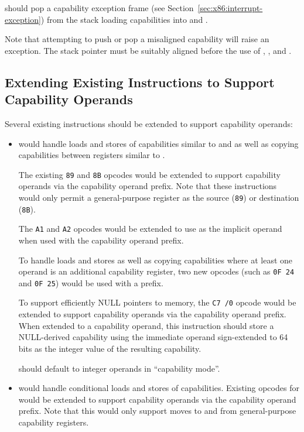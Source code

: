  should pop a capability exception frame (see
Section~\ref{sec:x86:interrupt-exception}) from the stack loading
capabilities into \CIP{} and \CSP{}.

Note that attempting to push or pop a misaligned capability will raise
an exception.  The stack pointer must be suitably aligned before the
use of , , and .

\subsection{Extending Existing Instructions to Support Capability Operands}

Several existing instructions should be extended to support
capability operands:

\begin{itemize}
  \item {} would handle loads and stores of
    capabilities similar to  and  as well as
    copying capabilities between registers similar to .

    The existing \texttt{89} and \texttt{8B} opcodes would be extended
    to support capability operands via the capability operand prefix.
    Note that these instructions would only permit a general-purpose
    register as the source (\texttt{89}) or destination (\texttt{8B}).

    The \texttt{A1} and \texttt{A2} opcodes would be extended to use
    \CAX{} as the implicit operand when used with the capability
    operand prefix.

    To handle loads and stores as well as copying capabilities where
    at least one operand is an additional capability register, two
    new opcodes (such as \texttt{0F 24} and \texttt{0F 25}) would be
    used with a \VEX{} prefix.

    To support efficiently NULL pointers to memory, the \texttt{C7 /0}
    opcode would be extended to support capability operands via
    the capability operand prefix.  When extended to a capability
    operand, this instruction should store a NULL-derived capability
    using the immediate operand sign-extended to 64 bits as the
    integer value of the resulting capability.

     should default to integer operands in ``capability
    mode''.

  \item {} would handle conditional loads and stores of
    capabilities.  Existing opcodes for  would be
    extended to support capability operands via the capability operand
    prefix.  Note that this would only support moves to and from
    general-purpose capability registers.


\end{itemize}
